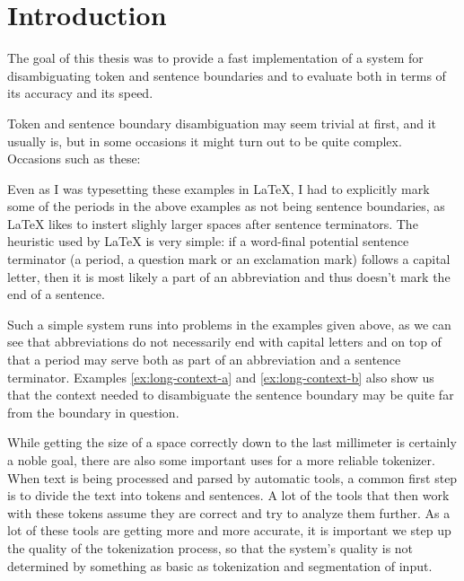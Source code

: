 \chapter*{Introduction}

The goal of this thesis was to provide a fast implementation of a system for
disambiguating token and sentence boundaries and to evaluate both in terms of
its accuracy and its speed.

Token and sentence boundary disambiguation may seem trivial at first, and it
usually is, but in some occasions it might turn out to be quite complex.
Occasions such as these:

\begin{exe}
\end{exe}

Even as I was typesetting these examples in \LaTeX{}, I had to explicitly mark
some of the periods in the above examples as not being sentence boundaries, as
\LaTeX{} likes to instert slighly larger spaces after sentence terminators.
The heuristic used by \LaTeX{} is very simple: if a word-final potential
sentence terminator (a period, a question mark or an exclamation mark) follows
a capital letter, then it is most likely a part of an abbreviation and thus
doesn't mark the end of a sentence.

Such a simple system runs into problems in the examples given above, as we
can see that abbreviations do not necessarily end with capital letters and on
top of that a period may serve both as part of an abbreviation and a sentence
terminator. Examples \ref{ex:long-context-a} and \ref{ex:long-context-b} also
show us that the context needed to disambiguate the sentence boundary may be
quite far from the boundary in question.

While getting the size of a space correctly down to the last millimeter is
certainly a noble goal, there are also some important uses for a more reliable
tokenizer. When text is being processed and parsed by automatic tools, a common
first step is to divide the text into tokens and sentences. A lot of the tools
that then work with these tokens assume they are correct and try to analyze
them further. As a lot of these tools are getting more and more accurate, it is
important we step up the quality of the tokenization process, so that the
system's quality is not determined by something as basic as tokenization and
segmentation of input. 

